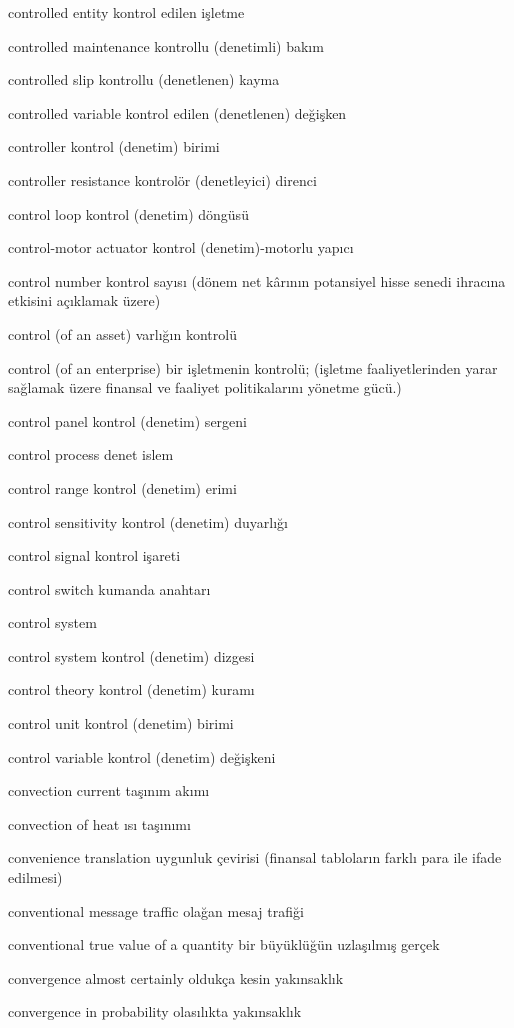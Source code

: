 \documentclass[12pt,fleqn]{article}\usepackage{../../common}
\begin{document}
controlled entity kontrol edilen işletme

controlled maintenance kontrollu (denetimli) bakım

controlled slip kontrollu (denetlenen) kayma

controlled variable kontrol edilen (denetlenen) değişken

controller kontrol (denetim) birimi

controller resistance kontrolör (denetleyici) direnci

control loop kontrol (denetim) döngüsü

control-motor actuator kontrol (denetim)-motorlu yapıcı

control number kontrol sayısı (dönem net kârının potansiyel hisse senedi ihracına etkisini açıklamak üzere)

control (of an asset) varlığın kontrolü

control (of an enterprise) bir işletmenin kontrolü; (işletme faaliyetlerinden yarar sağlamak üzere finansal ve faaliyet politikalarını yönetme gücü.)

control panel kontrol (denetim) sergeni

control process denet islem

control range kontrol (denetim) erimi

control sensitivity kontrol (denetim) duyarlığı

control signal kontrol işareti

control switch kumanda anahtarı

control system

control system kontrol (denetim) dizgesi

control theory kontrol (denetim) kuramı

control unit kontrol (denetim) birimi

control variable kontrol (denetim) değişkeni

convection current taşınım akımı

convection of heat ısı taşınımı

convenience translation uygunluk çevirisi (finansal tabloların farklı para ile ifade edilmesi)

conventional message traffic olağan mesaj trafiği

conventional true value of a quantity bir büyüklüğün uzlaşılmış gerçek

convergence almost certainly oldukça kesin yakınsaklık

convergence in probability olasılıkta yakınsaklık
\end{document}
